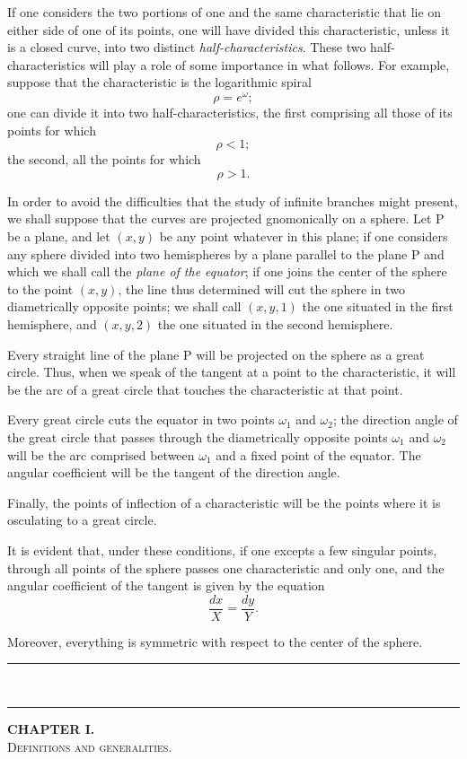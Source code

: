 \documentclass[11pt]{article}
\newcommand{\ornament}{\begin{center}\rule{2.5em}{0.4pt}\,\raisebox{0.1ex}{\tiny$\bullet\bullet\bullet$}\,\rule{2.5em}{0.4pt}\end{center}}
\begin{document}
If one considers the two portions of one and the same characteristic that lie on either side of one of its points, one will have divided this characteristic, unless it is a closed curve, into two distinct \emph{half-characteristics}. These two half-characteristics will play a role of some importance in what follows. For example, suppose that the characteristic is the logarithmic spiral
\[
\rho=e^{\omega};
\]
one can divide it into two half-characteristics, the first comprising all those of its points for which
\[
\rho<1;
\]
the second, all the points for which
\[
\rho>1.
\]

In order to avoid the difficulties that the study of infinite branches might present, we shall suppose that the curves are projected gnomonically on a sphere. Let P be a plane, and let $(x,y)$ be any point whatever in this plane; if one considers any sphere divided into two hemispheres by a plane parallel to the plane P and which we shall call the \emph{plane of the equator}; if one joins the center of the sphere to the point $(x,y)$, the line thus determined will cut the sphere in two diametrically opposite points; we shall call $(x,y,1)$ the one situated in the first hemisphere, and $(x,y,2)$ the one situated in the second hemisphere.

Every straight line of the plane P will be projected on the sphere as a great circle. Thus, when we speak of the tangent at a point to the characteristic, it will be the arc of a great circle that touches the characteristic at that point.

Every great circle cuts the equator in two points $\omega_1$ and $\omega_2$; the direction angle of the great circle that passes through the diametrically opposite points $\omega_1$ and $\omega_2$ will be the arc comprised between $\omega_1$ and a fixed point of the equator. The angular coefficient will be the tangent of the direction angle.

Finally, the points of inflection of a characteristic will be the points where it is osculating to a great circle.

It is evident that, under these conditions, if one excepts a few singular points, through all points of the sphere passes one characteristic and only one, and the angular coefficient of the tangent is given by the equation
\[
\frac{dx}{X}=\frac{dy}{Y}.
\]

Moreover, everything is symmetric with respect to the center of the sphere.

\ornament

\begin{center}
{\bfseries CHAPTER I.}\\[0.8em]
{\scshape Definitions and generalities.}
\end{center}
\end{document}
